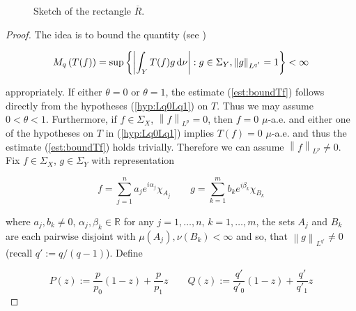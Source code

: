 \begin{figure}[h!tb]
	\centering
	\caption{Sketch of the rectangle $\overline{R}$.}
	\label{fig:Hadamards_three_lines_lemma_proof}
\end{figure}

\begin{proof}
	The idea is to bound the quantity (see \cite[189]{folland:real_analysis:1999})
	
	\begin{equation*}
		M_q\left( T(f) \right) = \sup\left\{ \left| \int_Y T(f)g \mathop{}\!\mathrm{d} \nu\right| : g \in \Sigma_Y, \left\| g\right\|_{L^{q'}} = 1\right\} < \infty
	\end{equation*}

	appropriately. If either $\theta = 0$ or $\theta = 1$, the estimate (\ref{est:boundTf}) follows directly from the hypotheses (\ref{hyp:Lq0Lq1}) on $T$. Thus we may assume \underline{$0 < \theta < 1$}. Furthermore, if $f \in \Sigma_X$, $\left\| f \right\|_{L^p} = 0$, then $f = 0$ $\mu$-a.e. and either one of the hypotheses on $T$ in (\ref{hyp:Lq0Lq1}) implies $T(f) = 0$ $\mu$-a.e. and thus the estimate (\ref{est:boundTf}) holds trivially. Therefore we can assume \underline{$\left\| f\right\|_{L^p} \neq 0$}. Fix $f \in \Sigma_X$, $g \in \Sigma_Y$ with representation
	
\begin{equation*}
	f = \sum_{j = 1}^n a_j e^{i\alpha_j}\chi_{A_j} \qquad g = \sum_{k = 1}^m b_k e^{i\beta_k}\chi_{B_k}
\end{equation*}

where $a_j,b_k \neq 0$, $\alpha_j,\beta_k \in \mathbb{R}$ for any $j = 1,\dots,n$, $k = 1,\dots,m$, the sets $A_j$ and $B_k$ are each pairwise disjoint with $\mu\left( A_j \right),\nu\left( B_k \right) < \infty$ and so, that $\left\| g\right\|_{L^{q'}} \neq 0$ (recall $q' := q/\left( q - 1 \right)$). Define

\begin{equation*}
	P(z) := \frac{p}{p_0}(1 - z) + \frac{p}{p_1}z \qquad Q(z) := \frac{q'}{q'_0}(1 - z) + \frac{q'}{q'_1}z
\end{equation*}


\end{proof}
